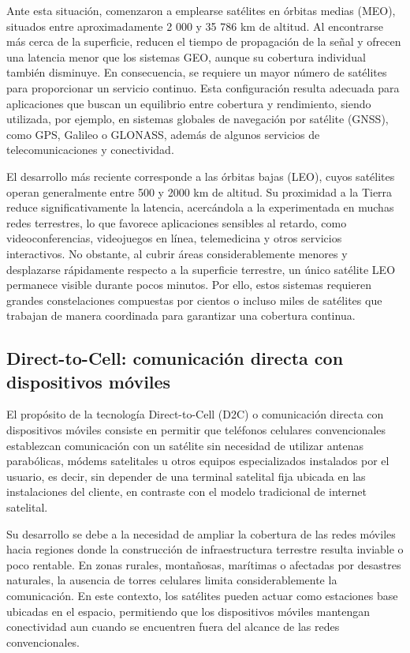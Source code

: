 Ante esta situación, comenzaron a emplearse satélites en órbitas medias (MEO), situados entre aproximadamente 2 000 y 35 786 km de altitud. Al encontrarse más cerca de la superficie, reducen el tiempo de propagación de la señal y ofrecen una latencia menor que los sistemas GEO, aunque su cobertura individual también disminuye. En consecuencia, se requiere un mayor número de satélites para proporcionar un servicio continuo. Esta configuración resulta adecuada para aplicaciones que buscan un equilibrio entre cobertura y rendimiento, siendo utilizada, por ejemplo, en sistemas globales de navegación por satélite (GNSS), como GPS, Galileo o GLONASS, además de algunos servicios de telecomunicaciones y conectividad.

El desarrollo más reciente corresponde a las órbitas bajas (LEO), cuyos satélites operan generalmente entre 500 y 2000 km de altitud. Su proximidad a la Tierra reduce significativamente la latencia, acercándola a la experimentada en muchas redes terrestres, lo que favorece aplicaciones sensibles al retardo, como videoconferencias, videojuegos en línea, telemedicina y otros servicios interactivos. No obstante, al cubrir áreas considerablemente menores y desplazarse rápidamente respecto a la superficie terrestre, un único satélite LEO permanece visible durante pocos minutos. Por ello, estos sistemas requieren grandes constelaciones compuestas por cientos o incluso miles de satélites que trabajan de manera coordinada para garantizar una cobertura continua.
\subsection{Direct-to-Cell: comunicación directa con dispositivos móviles}
El propósito de la tecnología Direct-to-Cell (D2C) o comunicación directa con dispositivos móviles consiste en permitir que teléfonos celulares convencionales establezcan comunicación con un satélite sin necesidad de utilizar antenas parabólicas, módems satelitales u otros equipos especializados instalados por el usuario, es decir, sin depender de una terminal satelital fija ubicada en las instalaciones del cliente, en contraste con el modelo tradicional de internet satelital.

Su desarrollo se debe a la necesidad de ampliar la cobertura de las redes móviles hacia regiones donde la construcción de infraestructura terrestre resulta inviable o poco rentable. En zonas rurales, montañosas, marítimas o afectadas por desastres naturales, la ausencia de torres celulares limita considerablemente la comunicación. En este contexto, los satélites pueden actuar como estaciones base ubicadas en el espacio, permitiendo que los dispositivos móviles mantengan conectividad aun cuando se encuentren fuera del alcance de las redes convencionales.

